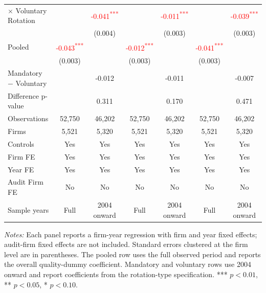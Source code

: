 \documentclass[10pt]{article}
\newcommand{\sym}[1]{\textsuperscript{#1}}
\begin{document}
\begin{minipage}{19cm}
\begin{threeparttable}
\begin{tabular}{l cc cc cc}
$\times$ Voluntary Rotation &  & \textcolor{red}{-0.041\sym{***}} &  & \textcolor{red}{-0.011\sym{***}} &  & \textcolor{red}{-0.039\sym{***}} \\
 &  & (0.004) &  & (0.003) &  & (0.003) \\
Pooled & \textcolor{red}{-0.043\sym{***}} &  & \textcolor{red}{-0.012\sym{***}} &  & \textcolor{red}{-0.041\sym{***}} &  \\
 & (0.003) &  & (0.003) &  & (0.003) &  \\
Mandatory $-$ Voluntary &  & -0.012 &  & -0.011 &  & -0.007 \\
Difference p-value &  & 0.311 &  & 0.170 &  & 0.471 \\
Observations & 52,750 & 46,202 & 52,750 & 46,202 & 52,750 & 46,202 \\
Firms & 5,521 & 5,320 & 5,521 & 5,320 & 5,521 & 5,320 \\
\midrule
Controls & Yes & Yes & Yes & Yes & Yes & Yes \\
Firm FE & Yes & Yes & Yes & Yes & Yes & Yes \\
Year FE & Yes & Yes & Yes & Yes & Yes & Yes \\
Audit Firm FE & No & No & No & No & No & No \\
Sample years & Full & 2004 onward & Full & 2004 onward & Full & 2004 onward \\
\bottomrule
\end{tabular}
\begin{tablenotes}\fontsize{9}{11}\selectfont
\item \fontsize{9}{11}\selectfont \textit{Notes:} Each panel reports a firm-year regression with firm and year fixed effects; audit-firm fixed effects are not included. Standard errors clustered at the firm level are in parentheses. The pooled row uses the full observed period and reports the overall quality-dummy coefficient. Mandatory and voluntary rows use 2004 onward and report coefficients from the rotation-type specification. *** \(p<0.01\), ** \(p<0.05\), * \(p<0.10\).
\end{tablenotes}
\end{threeparttable}

\end{minipage}
\end{document}
